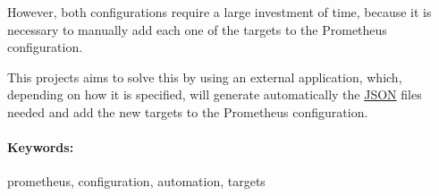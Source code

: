 However, both configurations require a large investment of time, because it is necessary to manually add each one of the targets to the Prometheus configuration.

This projects aims to solve this by using an external application, which, depending on how it is specified, will generate automatically the \url{JSON} files needed and add the new	targets to the Prometheus configuration.

\paragraph*{Keywords:} prometheus, configuration, automation, targets